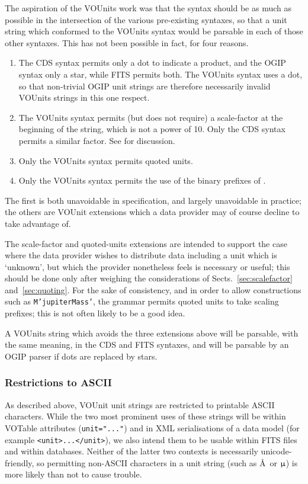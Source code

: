 \documentclass[11pt,a4paper]{ivoa}
\def\micro{{\ensuremath \mu}}
\def\micro{{\ensuremath \upmu}}
\begin{document}
The aspiration of the VOUnits work was that the syntax should be as
much as possible in the intersection of the various pre-existing
syntaxes, so that a unit string which conformed to the VOUnits syntax
would be parsable in each of those other syntaxes.  This has not been
possible in fact, for four reasons.
\begin{enumerate}
\item The CDS syntax permits only a dot to indicate a product, and the
OGIP syntax only a star, while FITS permits both.  The VOUnits syntax
uses a dot, so that non-trivial OGIP unit strings are therefore
necessarily invalid VOUnits strings in this one respect.
\item The VOUnits syntax permits (but does not require) a scale-factor
at the beginning of the string, which is not a power of 10.  Only the
CDS syntax permits a similar factor.
See  for discussion.
\item Only the VOUnits syntax permits quoted units.
\item Only the VOUnits syntax permits the use of the binary prefixes
of .
\end{enumerate}
The first is both unavoidable in specification, and largely
unavoidable in practice; the others are VOUnit extensions which a data
provider may of course decline to take advantage of.

The scale-factor and quoted-units extensions are intended to support
the case where the data provider wishes to distribute data including a
unit which is `unknown', but which the provider nonetheless feels is
necessary or useful; this should be done only after weighing the
considerations of Sects.~\ref{sec:scalefactor} and~\ref{sec:quoting}.
For the sake of consistency, and in order to allow
constructions such as \texttt{M'jupiterMass'}, the grammar permits quoted
units to take scaling prefixes; this is not often likely to be a good idea.

A VOUnits string which avoids the three extensions above will be
parsable, with the same meaning, in the CDS and FITS syntaxes, and
will be parsable by an OGIP parser if dots are replaced by stars.

\subsubsection{Restrictions to ASCII}

As described above, VOUnit unit strings are restricted to printable
ASCII characters.  While the two most prominent uses of these strings
will be within VOTable attributes (\verb|unit="..."|) and in XML
serialisations of a data model (for example \verb|<unit>...</unit>|),
we also intend them to be usable within FITS files and within
databases.  Neither of the latter two contexts is necessarily
unicode-friendly, so permitting non-ASCII characters in a unit string
(such as \AA\ or $\micro$) is more likely than not to cause trouble.
\end{document}
